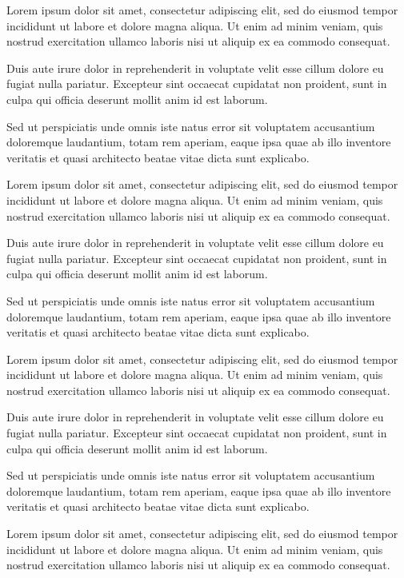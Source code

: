 \documentclass{memoir}
\begin{document}
Lorem ipsum dolor sit amet, consectetur adipiscing elit, sed do eiusmod tempor incididunt ut labore et dolore magna aliqua. Ut enim ad minim veniam, quis nostrud exercitation ullamco laboris nisi ut aliquip ex ea commodo consequat.

Duis aute irure dolor in reprehenderit in voluptate velit esse cillum dolore eu fugiat nulla pariatur. Excepteur sint occaecat cupidatat non proident, sunt in culpa qui officia deserunt mollit anim id est laborum.

Sed ut perspiciatis unde omnis iste natus error sit voluptatem accusantium doloremque laudantium, totam rem aperiam, eaque ipsa quae ab illo inventore veritatis et quasi architecto beatae vitae dicta sunt explicabo.

Lorem ipsum dolor sit amet, consectetur adipiscing elit, sed do eiusmod tempor incididunt ut labore et dolore magna aliqua. Ut enim ad minim veniam, quis nostrud exercitation ullamco laboris nisi ut aliquip ex ea commodo consequat.

Duis aute irure dolor in reprehenderit in voluptate velit esse cillum dolore eu fugiat nulla pariatur. Excepteur sint occaecat cupidatat non proident, sunt in culpa qui officia deserunt mollit anim id est laborum.

Sed ut perspiciatis unde omnis iste natus error sit voluptatem accusantium doloremque laudantium, totam rem aperiam, eaque ipsa quae ab illo inventore veritatis et quasi architecto beatae vitae dicta sunt explicabo.

Lorem ipsum dolor sit amet, consectetur adipiscing elit, sed do eiusmod tempor incididunt ut labore et dolore magna aliqua. Ut enim ad minim veniam, quis nostrud exercitation ullamco laboris nisi ut aliquip ex ea commodo consequat.

Duis aute irure dolor in reprehenderit in voluptate velit esse cillum dolore eu fugiat nulla pariatur. Excepteur sint occaecat cupidatat non proident, sunt in culpa qui officia deserunt mollit anim id est laborum.

Sed ut perspiciatis unde omnis iste natus error sit voluptatem accusantium doloremque laudantium, totam rem aperiam, eaque ipsa quae ab illo inventore veritatis et quasi architecto beatae vitae dicta sunt explicabo.

Lorem ipsum dolor sit amet, consectetur adipiscing elit, sed do eiusmod tempor incididunt ut labore et dolore magna aliqua. Ut enim ad minim veniam, quis nostrud exercitation ullamco laboris nisi ut aliquip ex ea commodo consequat.
\end{document}
